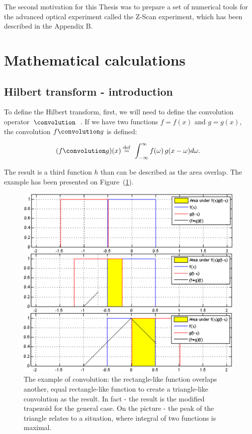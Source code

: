\documentclass[12pt,twoside,a4paper]{article}
\numberwithin{equation}{subsection}
\numberwithin{figure}{subsection}
\begin{document}
The second motivation for this Thesis was to prepare a set of numerical tools for the advanced optical experiment called the Z-Scan experiment, which has been described in the Appendix B.

\section{Mathematical calculations} \label{chap:mathematical_calculations}

\subsection{Hilbert transform - introduction}  \label{chap:mathematical_hilbert}

To define the Hilbert transform, first, we will need to define the convolution operator~$\convolution$~\cite{bracewell_fourier}. If we have two functions $f = f(x)$ and $g = g(x)$, the convolution $f \convolution g $ is defined:

\begin{equation} \label{eh:mth_convolution}
	(f \convolution g)(x) \stackrel{\mathrm{def}}{=}\  \int_{-\infty }^{\infty } f(\omega) \, g(x - \omega) d\omega .
\end{equation}
 
The result is a third function $h$ than can be described as the area overlap. The example has been presented on Figure~(\ref{fig:mathematical_convolution}).

\begin{figure} 
	\begin{center}
		\includegraphics[width=150mm]{img/nlo1.png}
		\caption{The example of convolution: the rectangle-like function overlaps another, equal rectangle-like function to create a triangle-like convolution as the result. In fact - the result is the modified trapezoid for the general case. On the picture - the peak of the triangle relates to a situation, where integral of two functions is maximal.  \label{fig:mathematical_convolution}}
	\end{center}
\end{figure}  
\end{document}
